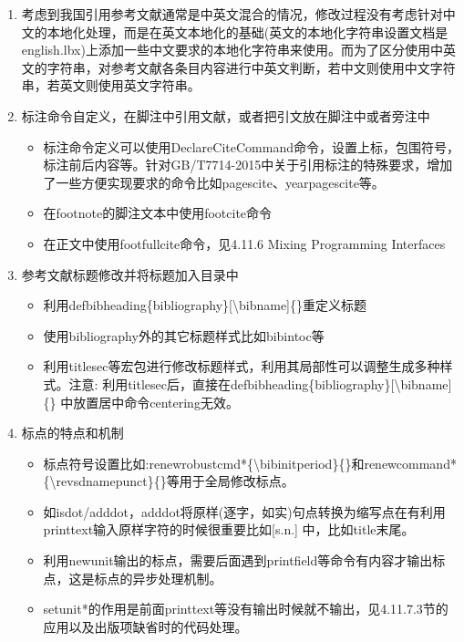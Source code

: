 \begin{enumerate}
  \item 考虑到我国引用参考文献通常是中英文混合的情况，修改过程没有考虑针对中文的本地化处理，而是在英文本地化的基础(英文的本地化字符串设置文档是english.lbx)上添加一些中文要求的本地化字符串来使用。而为了区分使用中英文的字符串，对参考文献各条目内容进行中英文判断，若中文则使用中文字符串，若英文则使用英文字符串。

  \item 标注命令自定义，在脚注中引用文献，或者把引文放在脚注中或者旁注中
  \begin{itemize}
    \item 标注命令定义可以使用DeclareCiteCommand命令，设置上标，包围符号，标注前后内容等。针对GB/T7714-2015中关于引用标注的特殊要求，增加了一些方便实现要求的命令比如pagescite、yearpagescite等。
    \item 在footnote的脚注文本中使用footcite命令
    \item 在正文中使用footfullcite命令，见4.11.6 Mixing Programming Interfaces
  \end{itemize}

  \item 参考文献标题修改并将标题加入目录中
  \begin{itemize}
    \item 利用defbibheading\{bibliography\}[\textbackslash bibname]\{\}重定义标题
    \item 使用bibliography外的其它标题样式比如bibintoc等
    \item 利用titlesec等宏包进行修改标题样式，利用其局部性可以调整生成多种样式。注意: 利用titlesec后，直接在defbibheading\{bibliography\}[\textbackslash bibname]\{\} 中放置居中命令centering无效。
  \end{itemize}

  \item 标点的特点和机制
  \begin{itemize}
    \item 标点符号设置比如:renewrobustcmd*\{\textbackslash bibinitperiod\}\{\}和renewcommand*\{\textbackslash revsdnamepunct\}\{\}等用于全局修改标点。
    \item 如isdot/adddot，adddot将原样(逐字，如实)句点转换为缩写点在有利用printtext输入原样字符的时候很重要比如[s.n.] 中，比如title末尾。
    \item 利用newunit输出的标点，需要后面遇到printfield等命令有内容才输出标点，这是标点的异步处理机制。
    \item setunit*的作用是前面printtext等没有输出时候就不输出，见4.11.7.3节的应用以及出版项缺省时的代码处理。
  \end{itemize}


\end{enumerate}
